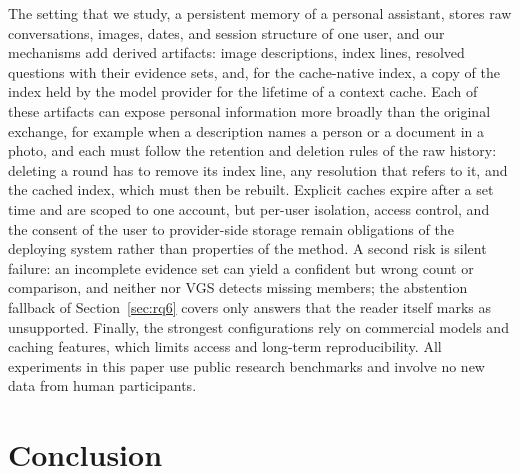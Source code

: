 The setting that we study, a persistent memory of a personal assistant, stores raw conversations, images, dates, and session structure of one user, and our mechanisms add derived artifacts: image descriptions, index lines, resolved questions with their evidence sets, and, for the cache-native index, a copy of the index held by the model provider for the lifetime of a context cache. Each of these artifacts can expose personal information more broadly than the original exchange, for example when a description names a person or a document in a photo, and each must follow the retention and deletion rules of the raw history: deleting a round has to remove its index line, any resolution that refers to it, and the cached index, which must then be rebuilt. Explicit caches expire after a set time and are scoped to one account, but per-user isolation, access control, and the consent of the user to provider-side storage remain obligations of the deploying system rather than properties of the method. A second risk is silent failure: an incomplete evidence set can yield a confident but wrong count or comparison, and neither \qss{} nor VGS detects missing members; the abstention fallback of Section~\ref{sec:rq6} covers only answers that the reader itself marks as unsupported. Finally, the strongest configurations rely on commercial models and caching features, which limits access and long-term reproducibility. All experiments in this paper use public research benchmarks and involve no new data from human participants.

\section{Conclusion}
\label{sec:conclusion}

